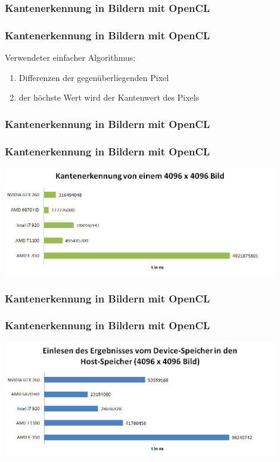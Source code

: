 \documentclass{beamer}
\begin{document}
\subsubsection*{Kantenerkennung in Bildern mit OpenCL}
\begin{frame}
\frametitle{Kantenerkennung in Bildern mit OpenCL}
Verwendeter einfacher Algorithmus:
\begin{enumerate}
\item Differenzen der gegenüberliegenden Pixel
\item der höchste Wert wird der Kantenwert des Pixels
\end{enumerate}
\end{frame}

\subsubsection*{Kantenerkennung in Bildern mit OpenCL}
\begin{frame}
\frametitle{Kantenerkennung in Bildern mit OpenCL}
\begin{center}
\includegraphics[width=12cm]{edge_detection_benchmark.PNG}
\end{center}
\end{frame}

\subsubsection*{Kantenerkennung in Bildern mit OpenCL}
\begin{frame}
\frametitle{Kantenerkennung in Bildern mit OpenCL}
\begin{center}
\includegraphics[width=12cm]{device_to_host_mem_benchmark.PNG}
\end{center}
\end{frame}
\end{document}
